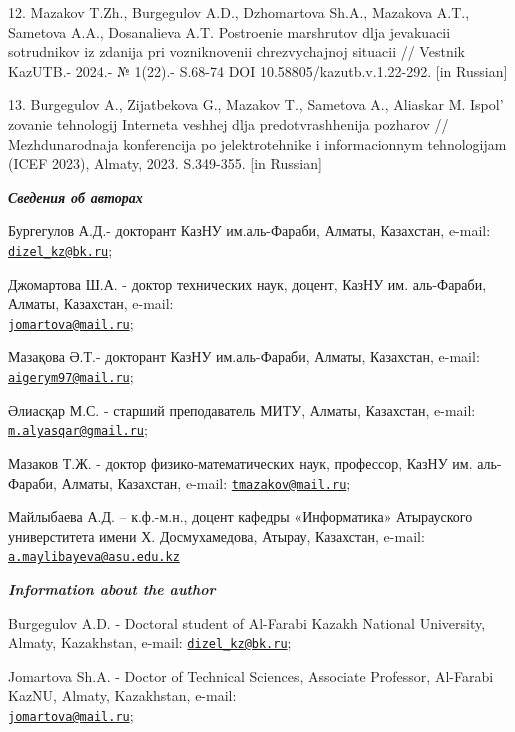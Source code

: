 \begin{references}
12. Mazakov T.Zh., Burgegulov A.D., Dzhomartova Sh.A., Mazakova A.T.,
Sametova A.A., Dosanalieva A.T. Postroenie marshrutov dlja jevakuacii
sotrudnikov iz zdanija pri vozniknovenii chrezvychajnoj situacii //
Vestnik KazUTB.- 2024.- № 1(22).- S.68-74
DOI 10.58805/kazutb.v.1.22-292. {[}in Russian{]}

13. Burgegulov A., Zijatbekova G., Mazakov T., Sametova A., Aliaskar M.
Ispol' zovanie tehnologij Interneta veshhej dlja
predotvrashhenija pozharov // Mezhdunarodnaja konferencija po
jelektrotehnike i informacionnym tehnologijam (ICEF 2023), Almaty, 2023.
S.349-355. {[}in Russian{]}
\end{references}

\begin{authorinfo}
\emph{{\bfseries Сведения об авторах}}

Бургегулов А.Д.- докторант КазНУ им.аль-Фараби, Алматы, Казахстан,
e-mail: \href{mailto:dizel_kz@bk.ru}{\nolinkurl{dizel\_kz@bk.ru}};

Джомартова Ш.А. - доктор технических наук, доцент, КазНУ им. аль-Фараби,
Алматы, Казахстан, e-mail:\\
\href{mailto:jomartova@mail.ru}{\nolinkurl{jomartova@mail.ru}};

Мазақова Ә.Т.- докторант КазНУ им.аль-Фараби, Алматы, Казахстан, e-mail:
\href{mailto:aigerym97@mail.ru}{\nolinkurl{aigerym97@mail.ru}};

Әлиасқар М.С. - старший преподаватель МИТУ, Алматы, Казахстан, e-mail:
\href{mailto:m.alyasqar@gmail.ru}{\nolinkurl{m.alyasqar@gmail.ru}};

Мазаков Т.Ж. - доктор физико-математических наук, профессор, КазНУ им.
аль-Фараби, Алматы, Казахстан, e-mail:
\href{mailto:tmazakov@mail.ru}{\nolinkurl{tmazakov@mail.ru}};

Майлыбаева А.Д. -- к.ф.-м.н., доцент кафедры «Информатика» Атырауского
универститета имени Х. Досмухамедова, Атырау, Казахстан, e-mail:
\href{mailto:a.maylibayeva@asu.edu.kz}{\nolinkurl{a.maylibayeva@asu.edu.kz}}

\emph{{\bfseries Information about the author}}

Burgegulov A.D. - Doctoral student of Al-Farabi Kazakh National
University, Almaty, Kazakhstan, e-mail:
\href{mailto:dizel_kz@bk.ru}{\nolinkurl{dizel\_kz@bk.ru}};

Jomartova Sh.A. - Doctor of Technical Sciences, Associate Professor,
Al-Farabi KazNU, Almaty, Kazakhstan, e-mail:\\
\href{mailto:jomartova@mail.ru}{\nolinkurl{jomartova@mail.ru}};


\end{authorinfo}
